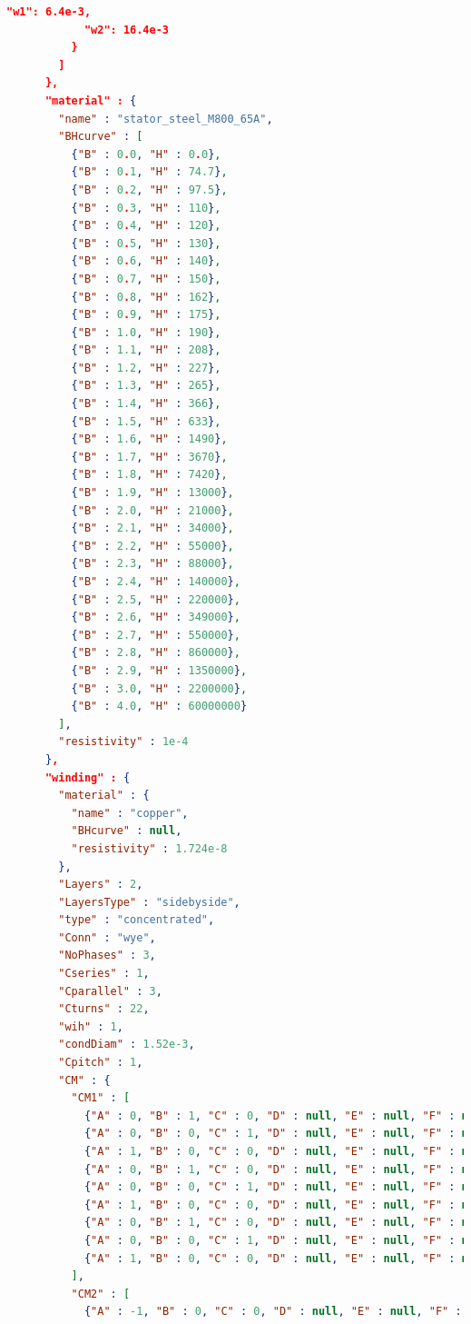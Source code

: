 \documentclass[justified]{tufte-book} %
\begin{document}
\begin{lstlisting}[language=json]
            "w1": 6.4e-3,
            "w2": 16.4e-3
          }
        ]
      },
      "material" : {
        "name" : "stator_steel_M800_65A",
        "BHcurve" : [
          {"B" : 0.0, "H" : 0.0},
          {"B" : 0.1, "H" : 74.7},
          {"B" : 0.2, "H" : 97.5},
          {"B" : 0.3, "H" : 110},
          {"B" : 0.4, "H" : 120},
          {"B" : 0.5, "H" : 130},
          {"B" : 0.6, "H" : 140},
          {"B" : 0.7, "H" : 150},
          {"B" : 0.8, "H" : 162},
          {"B" : 0.9, "H" : 175},
          {"B" : 1.0, "H" : 190},
          {"B" : 1.1, "H" : 208},
          {"B" : 1.2, "H" : 227},
          {"B" : 1.3, "H" : 265},
          {"B" : 1.4, "H" : 366},
          {"B" : 1.5, "H" : 633},
          {"B" : 1.6, "H" : 1490},
          {"B" : 1.7, "H" : 3670},
          {"B" : 1.8, "H" : 7420},
          {"B" : 1.9, "H" : 13000},
          {"B" : 2.0, "H" : 21000},
          {"B" : 2.1, "H" : 34000},
          {"B" : 2.2, "H" : 55000},
          {"B" : 2.3, "H" : 88000},
          {"B" : 2.4, "H" : 140000},
          {"B" : 2.5, "H" : 220000},
          {"B" : 2.6, "H" : 349000},
          {"B" : 2.7, "H" : 550000},
          {"B" : 2.8, "H" : 860000},
          {"B" : 2.9, "H" : 1350000},
          {"B" : 3.0, "H" : 2200000},
          {"B" : 4.0, "H" : 60000000}
        ],
        "resistivity" : 1e-4
      },
      "winding" : {
        "material" : {
          "name" : "copper",
          "BHcurve" : null,
          "resistivity" : 1.724e-8
        },
        "Layers" : 2,
        "LayersType" : "sidebyside",
        "type" : "concentrated",
        "Conn" : "wye",
        "NoPhases" : 3,
        "Cseries" : 1,
        "Cparallel" : 3,
        "Cturns" : 22,
        "wih" : 1,
        "condDiam" : 1.52e-3,
        "Cpitch" : 1,
        "CM" : {
          "CM1" : [
            {"A" : 0, "B" : 1, "C" : 0, "D" : null, "E" : null, "F" : null },
            {"A" : 0, "B" : 0, "C" : 1, "D" : null, "E" : null, "F" : null },
            {"A" : 1, "B" : 0, "C" : 0, "D" : null, "E" : null, "F" : null },
            {"A" : 0, "B" : 1, "C" : 0, "D" : null, "E" : null, "F" : null },
            {"A" : 0, "B" : 0, "C" : 1, "D" : null, "E" : null, "F" : null },
            {"A" : 1, "B" : 0, "C" : 0, "D" : null, "E" : null, "F" : null },
            {"A" : 0, "B" : 1, "C" : 0, "D" : null, "E" : null, "F" : null },
            {"A" : 0, "B" : 0, "C" : 1, "D" : null, "E" : null, "F" : null },
            {"A" : 1, "B" : 0, "C" : 0, "D" : null, "E" : null, "F" : null }
          ],
          "CM2" : [
            {"A" : -1, "B" : 0, "C" : 0, "D" : null, "E" : null, "F" : null },

\end{lstlisting}
\end{document}
